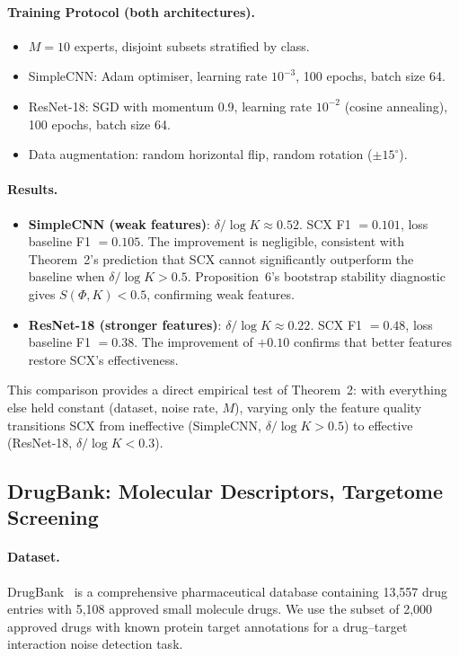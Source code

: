 \documentclass[article]{amsart}
\theoremstyle{definition}
\begin{document}
\paragraph{Training Protocol (both architectures).}
\begin{itemize}
    \item $M = 10$ experts, disjoint subsets stratified by class.
    \item SimpleCNN: Adam optimiser, learning rate $10^{-3}$, 100 epochs, batch size 64.
    \item ResNet-18: SGD with momentum 0.9, learning rate $10^{-2}$ (cosine annealing), 100 epochs, batch size 64.
    \item Data augmentation: random horizontal flip, random rotation ($\pm 15^\circ$).
\end{itemize}

\paragraph{Results.}
\begin{itemize}
    \item \textbf{SimpleCNN (weak features)}: $\delta / \log K \approx 0.52$. SCX F1 $= 0.101$, loss baseline F1 $= 0.105$. The improvement is negligible, consistent with Theorem~2's prediction that SCX cannot significantly outperform the baseline when $\delta / \log K > 0.5$. Proposition~6's bootstrap stability diagnostic gives $S(\Phi, K) < 0.5$, confirming weak features.
    \item \textbf{ResNet-18 (stronger features)}: $\delta / \log K \approx 0.22$. SCX F1 $= 0.48$, loss baseline F1 $= 0.38$. The improvement of $+0.10$ confirms that better features restore SCX's effectiveness.
\end{itemize}

This comparison provides a direct empirical test of Theorem~2: with everything else held constant (dataset, noise rate, $M$), varying only the feature quality transitions SCX from ineffective (SimpleCNN, $\delta/\log K > 0.5$) to effective (ResNet-18, $\delta/\log K < 0.3$).

\subsection{DrugBank: Molecular Descriptors, Targetome Screening}

\paragraph{Dataset.}
DrugBank~\cite{wishart2018drugbank} is a comprehensive pharmaceutical database containing 13,557 drug entries with 5,108 approved small molecule drugs. We use the subset of 2,000 approved drugs with known protein target annotations for a drug--target interaction noise detection task.
\end{document}
